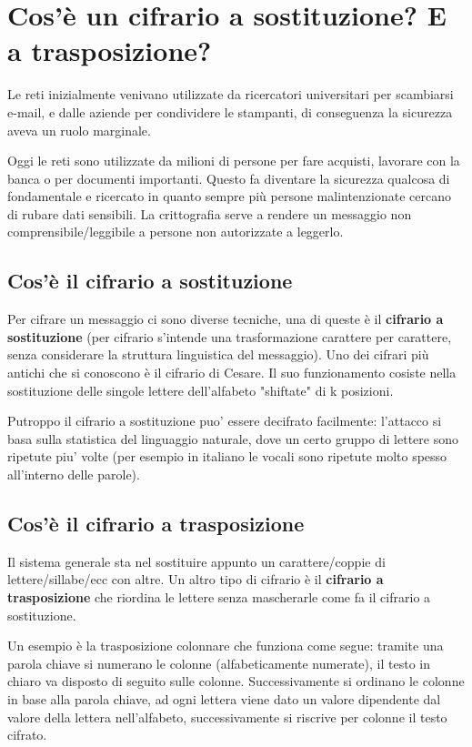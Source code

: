 \section{Cos'è un cifrario a sostituzione? E a trasposizione?}

Le reti inizialmente venivano utilizzate da ricercatori universitari per scambiarsi e-mail, e dalle aziende per condividere le stampanti, di conseguenza la sicurezza aveva un ruolo marginale.

Oggi le reti sono utilizzate da milioni di persone per fare acquisti, lavorare con la banca o per documenti importanti. Questo fa diventare la sicurezza qualcosa di fondamentale e ricercato in quanto sempre più persone malintenzionate cercano di rubare dati sensibili.
La crittografia serve a rendere un messaggio non comprensibile/leggibile a persone non autorizzate a leggerlo.
\subsection{Cos'è il cifrario a sostituzione}
Per cifrare un messaggio ci sono diverse tecniche, una di queste è il \textbf{cifrario a sostituzione} (per cifrario s'intende una trasformazione carattere per carattere, senza considerare la struttura linguistica del messaggio). Uno dei cifrari più antichi che si conoscono è il cifrario di Cesare. Il suo funzionamento cosiste nella sostituzione delle singole lettere dell'alfabeto "shiftate" di k posizioni. 

Putroppo il cifrario a sostituzione puo' essere decifrato facilmente: l'attacco si basa sulla statistica del linguaggio naturale, dove un certo gruppo di lettere sono ripetute piu' volte (per esempio in italiano le vocali sono ripetute molto spesso all'interno delle parole).
\subsection{Cos'è il cifrario a trasposizione}
Il sistema generale sta nel sostituire appunto un carattere/coppie di lettere/sillabe/ecc con altre.
Un altro tipo di cifrario è il \textbf{cifrario a trasposizione} che riordina le lettere senza mascherarle come fa il cifrario a sostituzione.

Un esempio è la trasposizione colonnare che funziona come segue: tramite una parola chiave si numerano le colonne (alfabeticamente numerate), il testo in chiaro va disposto di seguito sulle colonne. Successivamente si ordinano le colonne in base alla parola chiave, ad ogni lettera viene dato un valore dipendente dal valore della lettera nell'alfabeto, successivamente si riscrive per colonne il testo cifrato.

